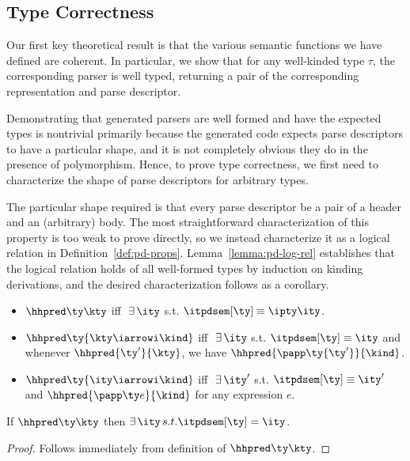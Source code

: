 \subsection{Type Correctness}
Our first key theoretical result is that the various semantic
functions we have defined are coherent.  In particular, we show that
for any well-kinded \ddca{} type $\tau$, the corresponding parser is
well typed, returning a pair of the corresponding representation and
parse descriptor.

Demonstrating that generated parsers are well formed
and have the expected types is nontrivial primarily because
the generated code expects parse descriptors to have a particular shape,
and it is not completely obvious they do in the presence of polymorphism.
Hence, to prove type correctness, we first need to characterize the shape of
parse descriptors for arbitrary \ddc{} types.   

The particular shape required is that every parse descriptor be a pair
of a header and an (arbitrary) body. The most straightforward
characterization of this property is too weak to prove directly, so we
instead characterize it as a logical relation in
Definition~\ref{def:pd-props}.  Lemma~\ref{lemma:pd-log-rel}
establishes that the logical relation holds of all well-formed \ddca{}
types by induction on kinding derivations, and the desired
characterization follows as a corollary.

\begin{definition}
\label{def:pd-props}
\begin{itemize}
\item $\hhpred \ty \kty$ iff $\ \exists\,\ity$ s.t. $\itpdsem[\ty] \equiv
  {\ipty \ity}$.
\item $\hhpred \ty {\kty \iarrowi \kind}$ iff $\ \exists\,\ity$
  s.t. $\itpdsem[\ty] \equiv \ity$ and whenever $\hhpred
  {\ty'}{\kty}$, we have $\hhpred {\papp \ty {\ty'}}{\kind}$.
\item $\hhpred \ty {\ity \iarrowi \kind}$ iff $\ \exists\,\ity'$
  s.t. $\itpdsem[\ty] \equiv \ity'$ and $\hhpred{\papp \ty e}{\kind}$
  for any expression $e$.
\end{itemize}
\end{definition}

\begin{lemma}
  If $\hhpred \ty \kty$ then $\exists \, \ity \, s.t. \itpdsem[\ty] =
  \ity$.
\label{lemma:H-prop}
\end{lemma}
\begin{proof}
  Follows immediately from definition of $\hhpred \ty \kty$.
\end{proof}

